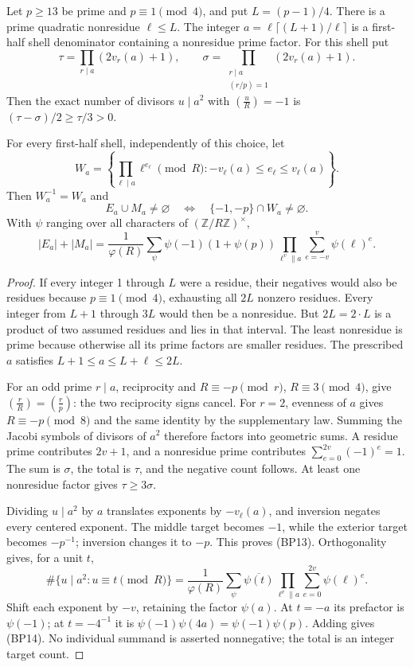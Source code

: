 \begin{proposition}
\label{prop:bp-character}
Let \(p\ge13\) be prime and \(p\equiv1\pmod4\), and put
\(L=(p-1)/4\). There is a prime quadratic nonresidue
\(\ell\le L\). The integer
\(a=\ell\lceil(L+1)/\ell\rceil\) is a first-half shell denominator
containing a nonresidue prime factor. For this shell put
\[
 \tau=\prod_{r\mid a}(2v_r(a)+1),\qquad
 \sigma=\prod_{\substack{r\mid a\\(r/p)=1}}(2v_r(a)+1).
\]
Then the exact number of divisors \(u\mid a^2\) with
\(\left(\frac uR\right)=-1\) is
\((\tau-\sigma)/2\ge\tau/3>0\).

For every first-half shell, independently of this choice, let
\[
 W_a=\left\{\prod_{\ell\mid a}\ell^{e_\ell}\pmod R:
                   -v_\ell(a)\le e_\ell\le v_\ell(a)\right\}.
\]
Then \(W_a^{-1}=W_a\) and
\[
 E_a\cup M_a\ne\varnothing
 \quad\Longleftrightarrow\quad \{-1,-p\}\cap W_a\ne\varnothing.
 \tag{BP13}
\]
With \(\psi\) ranging over all characters of
\((\mathbb Z/R\mathbb Z)^\times\),
\[
 |E_a|+|M_a|=
 \frac1{\varphi(R)}\sum_\psi\psi(-1)(1+\psi(p))
       \prod_{\ell^v\parallel a}\sum_{e=-v}^v\psi(\ell)^e.
 \tag{BP14}
\]
\end{proposition}
\begin{proof}
If every integer 1 through \(L\) were a residue, their negatives
would also be residues because \(p\equiv1\pmod4\), exhausting
all \(2L\) nonzero residues. Every integer from \(L+1\) through
\(3L\) would then be a nonresidue. But \(2L=2\cdot L\) is a
product of two assumed residues and lies in that interval. The least
nonresidue is prime because otherwise all its prime factors are
smaller residues. The prescribed \(a\) satisfies
\(L+1\le a\le L+\ell\le2L\).

For an odd prime \(r\mid a\), reciprocity and
\(R\equiv-p\pmod r\), \(R\equiv3\pmod4\), give
\(\left(\frac rR\right)=\left(\frac rp\right)\): the two
reciprocity signs cancel. For \(r=2\), evenness of \(a\)
gives \(R\equiv-p\pmod8\) and the same identity by the
supplementary law. Summing the Jacobi symbols of divisors of \(a^2\)
therefore factors into geometric sums. A residue prime contributes
\(2v+1\), and a nonresidue prime contributes
\(\sum_{e=0}^{2v}(-1)^e=1\). The sum is \(\sigma\), the
total is \(\tau\), and the negative count follows. At least one
nonresidue factor gives \(\tau\ge3\sigma\).

Dividing \(u\mid a^2\) by \(a\) translates exponents by
\(-v_\ell(a)\), and inversion negates every centered exponent.
The middle target becomes \(-1\), while the exterior target
becomes \(-p^{-1}\); inversion changes it to \(-p\). This
proves (BP13). Orthogonality gives, for a unit \(t\),
\[
 \#\{u\mid a^2:u\equiv t\pmod R\}
 =\frac1{\varphi(R)}\sum_\psi\overline{\psi(t)}
       \prod_{\ell^v\parallel a}\sum_{e=0}^{2v}\psi(\ell)^e.
\]
Shift each exponent by \(-v\), retaining the factor \(\psi(a)\).
At \(t=-a\) its prefactor is \(\psi(-1)\); at
\(t=-4^{-1}\) it is \(\psi(-1)\psi(4a)=\psi(-1)\psi(p)\).
Adding gives (BP14). No individual summand is asserted nonnegative;
the total is an integer target count.
\end{proof}

